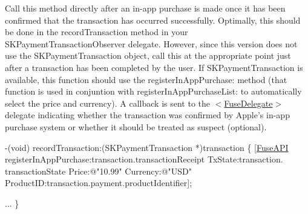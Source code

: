 Call this method directly after an in-\/app purchase is made once it has been confirmed that the transaction has occurred successfully. Optimally, this should be done in the record\+Transaction method in your S\+K\+Payment\+Transaction\+Observer delegate. However, since this version does not use the S\+K\+Payment\+Transaction object, call this at the appropriate point just after a transaction has been completed by the user. If S\+K\+Payment\+Transaction is available, this function should use the register\+In\+App\+Purchase\+: method (that function is used in conjuntion with register\+In\+App\+Purchase\+List\+: to automatically select the price and currency). A callback is sent to the $<$\hyperlink{protocol_fuse_delegate-p}{Fuse\+Delegate}$>$ delegate indicating whether the transaction was confirmed by Apple's in-\/app purchase system or whether it should be treated as suspect (optional).


\begin{DoxyCode}
-(void) recordTransaction:(SKPaymentTransaction *)transaction
\{
   [\hyperlink{interface_fuse_a_p_i}{FuseAPI} registerInAppPurchase:transaction.transactionReceipt TxState:transaction.
      transactionState Price:\textcolor{stringliteral}{@"10.99"} Currency:\textcolor{stringliteral}{@"USD"} ProductID:transaction.payment.productIdentifier];

...
\}
\end{DoxyCode}



